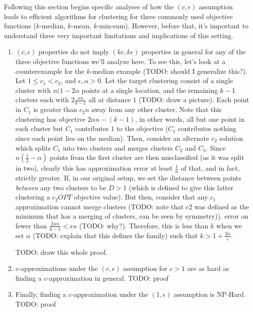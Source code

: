 \documentclass[paper=a4, fontsize=11pt]{scrartcl} %
\numberwithin{equation}{section} %
\numberwithin{figure}{section} %
\numberwithin{table}{section} %
\begin{document}
Following this section begins specific analyses of how the $(c, \epsilon)$ assumption leads to efficient algorithms for clustering for three commonly used objective functions ($k$-median, $k$-mean, $k$-min-sum).  However, before that, it's important to understand three very important limitations and implications of this setting.

\begin{enumerate}
\item $(c, \epsilon)$ properties do not imply $(kc, k\epsilon)$ properties in general for any of the three objective functions we'll analyze here.  To see this, let's look at a counterexample for the $k$-median example (TODO: should I generalize this?).  Let $1 \leq c_1 < c_2 $, and $\epsilon, \alpha > 0$.  Let the target clustering consist of a single cluster with $n(1 - 2\alpha$ points at a single location, and the remaining $k-1$ clusters each with $2\frac{\alpha n}{k-1}$ all at distance $1$ (TODO: draw a picture).  Each point in $C_1$ is greater than $c_2 n$ away from any other cluster.  Note that this clustering has objective $2\alpha n - (k - 1)$, in other words, all but one point in each cluster but $C_1$ contributes $1$ to the objective ($C_1$ contributes nothing since each point lies on the median).  Then, consider an alternate $c_2$ solution which splits $C_1$ into two clusters and merges clusters $C_2$ and $C_3$.  Since $n(\frac{1}{2} - \alpha)$ points from the first cluster are then misclassified (as it was split in two), clearly this has approximation error at least 
$\frac{1}{n}$ of that, and in fact, strictly greater.  If, in our original setup, we set the distance between points \emph{between} any two clusters to be $D > 1$ (which is defined to give this latter clustering a $c_2 OPT$ objective value).  But then, consider that any $c_1$ approximation cannot merge clusters (TODO: note that c2 was defined as the minimum that has a merging of clusters, can be seen by symmetry)).  error on fewer than $\frac{2\alpha n}{k-1} < \epsilon n$ (TODO: why?). Therefore, this is less than $k$ when we set $\alpha$ (TODO: explain that this defines the family) such that $k > 1 + \frac{2\alpha}{\epsilon} $.

TODO: draw this whole proof.



\item $c$-approximations under the $(c, \epsilon)$ assumption for $c > 1$ are as hard as finding a $c$-approximation in general. TODO: proof

\item Finally, finding a $c$-approximation under the $(1, \epsilon)$ assumption is NP-Hard. TODO: proof

\end{enumerate}
\end{document}
